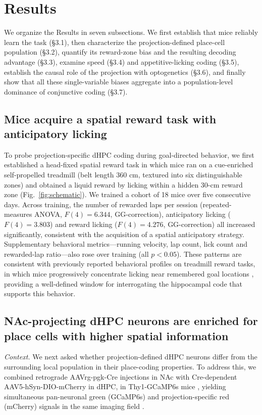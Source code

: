 \documentclass[11pt]{article}
\begin{document}
\section{Results}

We organize the Results in seven subsections. We first establish that mice reliably learn the task (\S3.1), then characterize the projection-defined place-cell population (\S3.2), quantify its reward-zone bias and the resulting decoding advantage (\S3.3), examine speed (\S3.4) and appetitive-licking coding (\S3.5), establish the causal role of the projection with optogenetics (\S3.6), and finally show that all these single-variable biases aggregate into a population-level dominance of conjunctive coding (\S3.7).

\subsection{Mice acquire a spatial reward task with anticipatory licking}

To probe projection-specific dHPC coding during goal-directed behavior, we first established a head-fixed spatial reward task in which mice ran on a cue-enriched self-propelled treadmill (belt length 360 cm, textured into six distinguishable zones) and obtained a liquid reward by licking within a hidden 30-cm reward zone (Fig.~\ref{fig:schematic}). We trained a cohort of 18 mice over five consecutive days. Across training, the number of rewarded laps per session (repeated-measures ANOVA, $F(4)=6.344$, GG-correction), anticipatory licking ($F(4)=3.803$) and reward licking ($F(4)=4.276$, GG-correction) all increased significantly, consistent with the acquisition of a spatial anticipatory strategy. Supplementary behavioral metrics---running velocity, lap count, lick count and rewarded-lap ratio---also rose over training (all $p<0.05$). These patterns are consistent with previously reported behavioral profiles on treadmill reward tasks, in which mice progressively concentrate licking near remembered goal locations \citep{Hok2007Goal,Mamad2017PlaceField}, providing a well-defined window for interrogating the hippocampal code that supports this behavior.

\subsection{NAc-projecting dHPC neurons are enriched for place cells with higher spatial information}

\textit{Context.} We next asked whether projection-defined dHPC neurons differ from the surrounding local population in their place-coding properties. To address this, we combined retrograde AAVrg-pgk-Cre injections in NAc \citep{Tervo2016AAVretro} with Cre-dependent AAV5-hSyn-DIO-mCherry in dHPC, in Thy1-GCaMP6s mice \citep{Dana2014Thy1GCaMP6,Chen2013GCaMP6}, yielding simultaneous pan-neuronal green (GCaMP6s) and projection-specific red (mCherry) signals in the same imaging field \citep{Pnevmatikakis2017NoRMCorre,Giovannucci2019CaImAn}.
\end{document}

